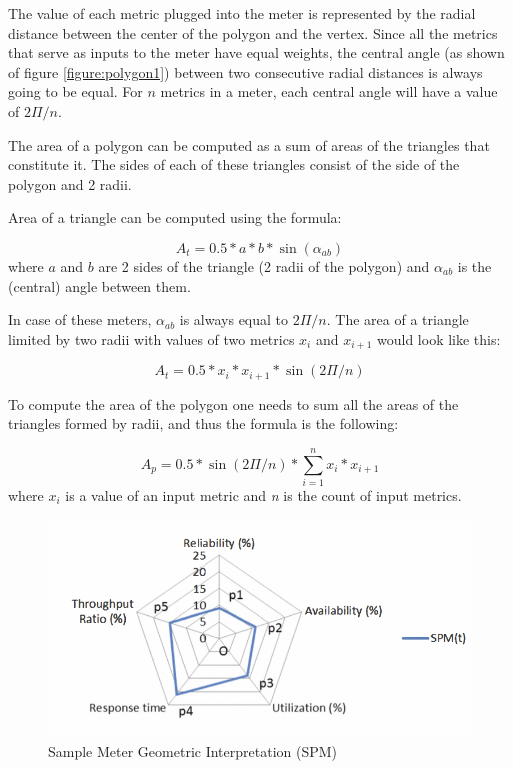 \documentclass{uvamscse}
\begin{document}
The value of each metric plugged into the meter is represented by the radial distance between the center of the polygon and the vertex. Since all the metrics that serve as inputs to the meter have equal weights, the central angle (as shown of figure \ref{figure:polygon1}) between two consecutive radial distances is always going to be equal. For \textit{$n$} metrics in a meter, each central angle will have a value of \textit{$2\Pi/n$}.

The area of a polygon can be computed as a sum of areas of the triangles that constitute it. The sides of each of these triangles consist of the side of the polygon and 2 radii.

Area of a triangle can be computed using the formula:
\begin{center}
  $$A_t = 0.5 * a*b * \sin(\alpha_{ab}) $$
  where \textit{$a$} and \textit{$b$} are 2 sides of the triangle (2 radii of the polygon) and $\alpha_{ab}$ is the (central) angle between them.
\end{center}

In case of these meters, $\alpha_{ab}$ is always equal to $2\Pi/n$. The area of a triangle limited by two radii with values of two metrics $x_i$ and $x_{i+1}$ would look like this:
\begin{center}
  $$A_t = 0.5 * x_i*x_{i+1} * \sin(2\Pi/n) $$
\end{center}

To compute the area of the polygon one needs to sum all the areas of the triangles formed by radii, and thus the formula is the following:
\begin{center}
  \texttt{$$A_p = 0.5 * \sin(2\Pi/n) * \sum_{i=1}^{n}x_i*x_{i+1}$$}
  where \textit{$x_i$} is a value of an input metric and \textit{n} is the count of input metrics.
\end{center}

\begin{figure}[h]
\centering
\includegraphics[scale=0.5]{polygon}
\caption{Sample Meter Geometric Interpretation (SPM)}
\label{figure:polygon}
\end{figure}
\end{document}

